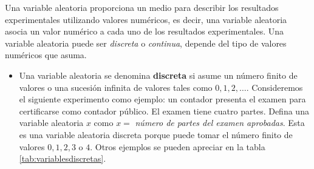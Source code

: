 \documentclass[
]{book}
\providecommand{\tightlist}{%
  \setlength{\itemsep}{0pt}\setlength{\parskip}{0pt}}
\theoremstyle{definition}
\theoremstyle{definition}
\theoremstyle{definition}
\theoremstyle{definition}
\theoremstyle{remark}
\begin{document}
Una variable aleatoria proporciona un medio para describir los resultados experimentales utilizando valores numéricos, es decir, una variable aleatoria asocia un valor numérico a cada uno de los resultados experimentales. Una variable aleatoria puede ser \emph{discreta} o \emph{continua}, depende del tipo de valores numéricos que asuma. \citep[página 187]{anderson}

\begin{itemize}
\tightlist
\item
  Una variable aleatoria se denomina \textbf{discreta} si asume un número finito de valores o una sucesión infinita de valores tales como \(0,1,2,\ldots\). Consideremos el siguiente experimento como ejemplo: un contador presenta el examen para certificarse como contador público. El examen tiene cuatro partes. Defina una variable aleatoria \(x\) como \(x =\) \emph{número de partes del examen aprobadas}. Esta es una variable aleatoria discreta porque puede tomar el número finito de valores \(0,1,2,3\) o \(4\). Otros ejemplos se pueden apreciar en la tabla \ref{tab:variablesdiscretas}.
\end{itemize}

\begin{table}[H]

\caption{\label{tab:variablesdiscretas}Ejemplos de variables aleatorias discretas}
\centering
{}
\end{table}
\end{document}
